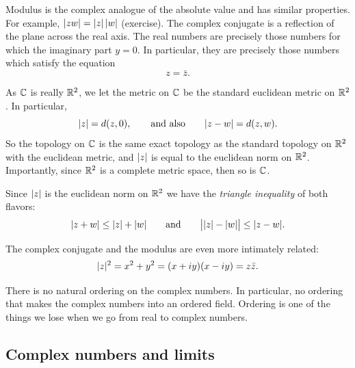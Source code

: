 Modulus is the complex analogue of the absolute value and
has similar properties.
For example,
$\lvert {zw} \rvert = \lvert {z} \rvert \, \lvert {w} \rvert$ (exercise).
The complex conjugate is a reflection of the plane across the real axis.
The real numbers are precisely those numbers for which the imaginary
part $y=0$.  In particular, they are precisely those numbers which satisfy
the equation
\begin{equation*}
z = \bar{z} .
\end{equation*}

As ${\mathbb{C}}$ is really ${\mathbb{R}}^2$, we let the metric on ${\mathbb{C}}$ be the standard
euclidean metric on ${\mathbb{R}}^2$.
In particular,
\begin{equation*}
\lvert {z} \rvert = d(z,0) , \qquad 
\text{and also} \qquad 
\lvert {z-w} \rvert = d(z,w) .
\end{equation*}
So the topology on ${\mathbb{C}}$ is
the same exact topology as the standard topology on ${\mathbb{R}}^2$
with the euclidean metric,
and $\lvert {z} \rvert$ is equal to the euclidean norm on ${\mathbb{R}}^2$.
Importantly, since ${\mathbb{R}}^2$ is a complete metric space, then
so is ${\mathbb{C}}$.

Since $\lvert {z} \rvert$ is the euclidean norm on ${\mathbb{R}}^2$ we have the
\emph{triangle inequality}
of both flavors:
\begin{equation*}
\lvert {z+w} \rvert \leq \lvert {z} \rvert+\lvert {w} \rvert \qquad \text{and} \qquad
\big\lvert \lvert {z} \rvert-\lvert {w} \rvert \big\rvert \leq \lvert {z-w} \rvert .
\end{equation*}

The complex conjugate and the modulus are even more intimately related:
\begin{equation*}
\lvert {z} \rvert^2 =
x^2+y^2 =
(x+iy)(x-iy) =
z \bar{z} .
\end{equation*}

\begin{remark}
There is no natural ordering on the complex numbers.
In particular,
no ordering that makes the complex numbers into an ordered field.
Ordering is one of the things we lose when we go from real to complex
numbers.
\end{remark}

\subsection{Complex numbers and limits}

